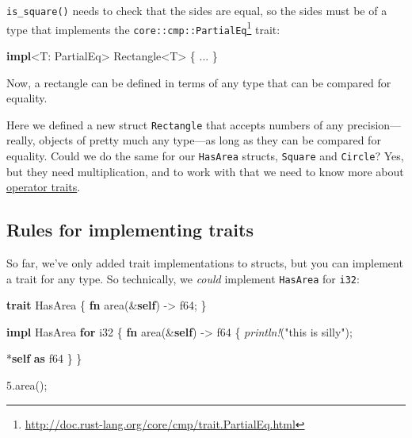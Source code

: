 \documentclass[a4paper,]{book}
\newenvironment{Shaded}{\begin{snugshade}}{\end{snugshade}}
\newcommand{\KeywordTok}[1]{\textcolor[rgb]{0.13,0.29,0.53}{\textbf{{#1}}}}
\newcommand{\DataTypeTok}[1]{\textcolor[rgb]{0.13,0.29,0.53}{{#1}}}
\newcommand{\DecValTok}[1]{\textcolor[rgb]{0.00,0.00,0.81}{{#1}}}
\newcommand{\StringTok}[1]{\textcolor[rgb]{0.31,0.60,0.02}{{#1}}}
\newcommand{\BuiltInTok}[1]{{#1}}
\newcommand{\PreprocessorTok}[1]{\textcolor[rgb]{0.56,0.35,0.01}{\textit{{#1}}}}
\newcommand{\NormalTok}[1]{{#1}}
\renewcommand{\href}[2]{#2\footnote{\url{#1}}}
\begin{document}
\texttt{is\_square()} needs to check that the sides are equal, so the
sides must be of a type that implements the
\href{http://doc.rust-lang.org/core/cmp/trait.PartialEq.html}{\texttt{core::cmp::PartialEq}}
trait:

\begin{Shaded}
\begin{Highlighting}[]
\KeywordTok{impl}\NormalTok{<T: }\BuiltInTok{PartialEq}\NormalTok{> Rectangle<T> \{ ... \}}
\end{Highlighting}
\end{Shaded}

Now, a rectangle can be defined in terms of any type that can be
compared for equality.

Here we defined a new struct \texttt{Rectangle} that accepts numbers of
any precision---really, objects of pretty much any type---as long as
they can be compared for equality. Could we do the same for our
\texttt{HasArea} structs, \texttt{Square} and \texttt{Circle}? Yes, but
they need multiplication, and to work with that we need to know more
about \protect\hyperlink{sec--operators-and-overloading}{operator
traits}.

\subsection{Rules for implementing
traits}\label{rules-for-implementing-traits}

So far, we've only added trait implementations to structs, but you can
implement a trait for any type. So technically, we \emph{could}
implement \texttt{HasArea} for \texttt{i32}:

\begin{Shaded}
\begin{Highlighting}[]
\KeywordTok{trait} \NormalTok{HasArea \{}
    \KeywordTok{fn} \NormalTok{area(&}\KeywordTok{self}\NormalTok{) -> }\DataTypeTok{f64}\NormalTok{;}
\NormalTok{\}}

\KeywordTok{impl} \NormalTok{HasArea }\KeywordTok{for} \DataTypeTok{i32} \NormalTok{\{}
    \KeywordTok{fn} \NormalTok{area(&}\KeywordTok{self}\NormalTok{) -> }\DataTypeTok{f64} \NormalTok{\{}
        \PreprocessorTok{println!}\NormalTok{(}\StringTok{"this is silly"}\NormalTok{);}

        \NormalTok{*}\KeywordTok{self} \KeywordTok{as} \DataTypeTok{f64}
    \NormalTok{\}}
\NormalTok{\}}

\DecValTok{5.}\NormalTok{area();}
\end{Highlighting}
\end{Shaded}
\end{document}
